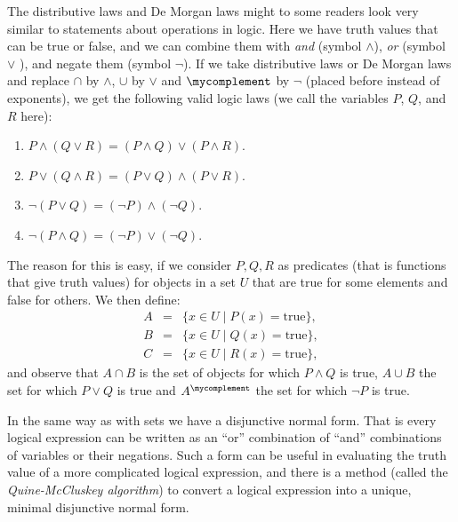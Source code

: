 The distributive laws and De Morgan laws might to some readers look very
similar to statements about operations in logic. Here we have truth values
that can be true or false, and we can combine them with {\em and} (symbol
$\wedge$),
{\em or} (symbol $\vee$
),
and negate them (symbol $\lnot$). If we take distributive laws or De Morgan
laws and replace $\cap$ by $\wedge$, $\cup$ by $\vee$ and $\mycomplement$ by
$\lnot$ (placed before instead of exponents), we get the following valid
logic laws (we call the variables $P$, $Q$, and $R$ here):
\begin{enumerate}
\item $P\wedge (Q\vee R)=(P\wedge Q)\vee(P\wedge R)$.
\item $P\vee (Q\wedge R)=(P\vee Q)\wedge(P\vee R)$.
\item $\lnot(P\vee Q)=(\lnot P)\wedge (\lnot Q)$.
\item $\lnot(P\wedge Q)=(\lnot P)\vee (\lnot Q)$.
\end{enumerate}
The reason for this is easy, if we consider $P,Q,R$ as predicates (that is
functions that give truth values) for
objects in a set $U$ that are true for some elements and false for others.
We then define:
\begin{eqnarray*}
A&=&\{x\in U\mid P(x)=\mbox{true}\},\\
B&=&\{x\in U\mid Q(x)=\mbox{true}\},\\
C&=&\{x\in U\mid R(x)=\mbox{true}\},
\end{eqnarray*}
and observe that $A\cap B$ is the set of objects for which $P\wedge Q$ is
true, $A\cup B$ the set for which $P\vee Q$ is true and $A^\mycomplement$ the
set for which $\lnot P$ is true.
\medskip

In the same way as with sets we have a disjunctive normal form. That is
every logical expression can be written as an ``or'' combination of ``and''
combinations of variables or their negations.
Such a form can be useful in evaluating the truth value of a more
complicated logical expression, and there is a method (called the
{\em Quine-McCluskey algorithm}) to convert a logical expression into a
unique, minimal disjunctive normal form.

